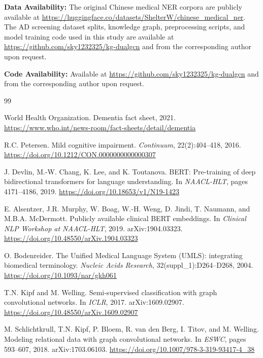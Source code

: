 \documentclass[11pt,onecolumn,a4paper]{article}
\begin{document}
\textbf{Data Availability:} The original Chinese medical NER corpora are publicly available at \url{https://huggingface.co/datasets/ShelterW/chinese\_medical\_ner}. The AD screening dataset splits, knowledge graph, preprocessing scripts, and model training code used in this study are available at \url{https://github.com/sky1232325/kg-dualgcn} and from the corresponding author upon request.

\textbf{Code Availability:} Available at \url{https://github.com/sky1232325/kg-dualgcn} and from the corresponding author upon request.

\begin{thebibliography}{99}

World Health Organization.
\newblock Dementia fact sheet, 2021.
\newblock \url{https://www.who.int/news-room/fact-sheets/detail/dementia}

R.C. Petersen.
\newblock Mild cognitive impairment.
\newblock \textit{Continuum}, 22(2):404--418, 2016.
\newblock \url{https://doi.org/10.1212/CON.0000000000000307}

J. Devlin, M.-W. Chang, K. Lee, and K. Toutanova.
\newblock BERT: Pre-training of deep bidirectional transformers for language understanding.
\newblock In \textit{NAACL-HLT}, pages 4171--4186, 2019.
\newblock \url{https://doi.org/10.18653/v1/N19-1423}

E. Alsentzer, J.R. Murphy, W. Boag, W.-H. Weng, D. Jindi, T. Naumann, and M.B.A. McDermott.
\newblock Publicly available clinical BERT embeddings.
\newblock In \textit{Clinical NLP Workshop at NAACL-HLT}, 2019. arXiv:1904.03323.
\newblock \url{https://doi.org/10.48550/arXiv.1904.03323}

O. Bodenreider.
\newblock The Unified Medical Language System (UMLS): integrating biomedical terminology.
\newblock \textit{Nucleic Acids Research}, 32(suppl\_1):D264--D268, 2004.
\newblock \url{https://doi.org/10.1093/nar/gkh061}

T.N. Kipf and M. Welling.
\newblock Semi-supervised classification with graph convolutional networks.
\newblock In \textit{ICLR}, 2017. arXiv:1609.02907.
\newblock \url{https://doi.org/10.48550/arXiv.1609.02907}

M. Schlichtkrull, T.N. Kipf, P. Bloem, R. van den Berg, I. Titov, and M. Welling.
\newblock Modeling relational data with graph convolutional networks.
\newblock In \textit{ESWC}, pages 593--607, 2018. arXiv:1703.06103.
\newblock \url{https://doi.org/10.1007/978-3-319-93417-4_38}


\end{thebibliography}
\end{document}

